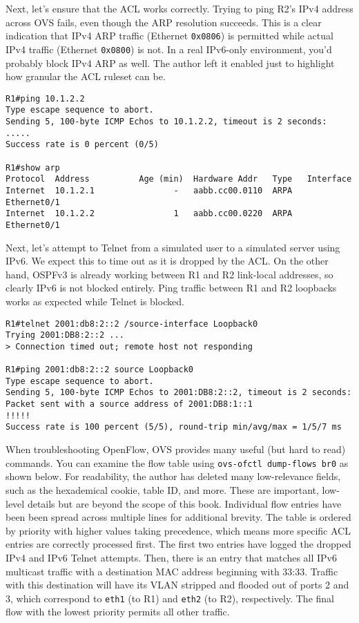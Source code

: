 Next, let's ensure that the ACL works correctly. Trying to ping R2's
IPv4 address across OVS fails, even though the ARP resolution succeeds.
This is a clear indication that IPv4 ARP traffic (Ethernet \verb|0x0806|) is
permitted while actual IPv4 traffic (Ethernet \verb|0x0800|) is not. In a real
IPv6-only environment, you'd probably block IPv4 ARP as well. The author
left it enabled just to highlight how granular the ACL ruleset can be.

\begin{verbatim}
R1#ping 10.1.2.2
Type escape sequence to abort.
Sending 5, 100-byte ICMP Echos to 10.1.2.2, timeout is 2 seconds:
.....
Success rate is 0 percent (0/5)

R1#show arp
Protocol  Address          Age (min)  Hardware Addr   Type   Interface
Internet  10.1.2.1                -   aabb.cc00.0110  ARPA   Ethernet0/1
Internet  10.1.2.2                1   aabb.cc00.0220  ARPA   Ethernet0/1
\end{verbatim}

Next, let's attempt to Telnet from a simulated user to a simulated server
using IPv6. We expect this to time out as it is dropped by the ACL\@. On
the other hand, OSPFv3 is already working between R1 and R2 link-local
addresses, so clearly IPv6 is not blocked entirely. Ping traffic between
R1 and R2 loopbacks works as expected while Telnet is blocked.

\begin{verbatim}
R1#telnet 2001:db8:2::2 /source-interface Loopback0
Trying 2001:DB8:2::2 ...
> Connection timed out; remote host not responding

R1#ping 2001:db8:2::2 source Loopback0
Type escape sequence to abort.
Sending 5, 100-byte ICMP Echos to 2001:DB8:2::2, timeout is 2 seconds:
Packet sent with a source address of 2001:DB8:1::1
!!!!!
Success rate is 100 percent (5/5), round-trip min/avg/max = 1/5/7 ms
\end{verbatim}

When troubleshooting OpenFlow, OVS provides many useful (but hard to read)
commands. You can examine the flow table using \verb|ovs-ofctl dump-flows br0|
as shown below. For readability, the author has deleted many low-relevance fields,
such as the hexademical cookie, table ID, and more. These are important, low-level
details but are beyond the scope of this book. Individual flow entries have been
been spread across multiple lines for additional brevity. The table is ordered
by priority with higher values taking precedence, which means more specific
ACL entries are correctly processed first. The first two entries have logged
the dropped IPv4 and IPv6 Telnet attempts. Then, there is an entry that matches
all IPv6 multicast traffic with a destination MAC address beginning with 33:33.
Traffic with this destination will have its VLAN stripped and flooded out
of ports 2 and 3, which correspond to \verb|eth1| (to R1) and \verb|eth2|
(to R2), respectively. The final flow with the lowest priority permits all
other traffic.

